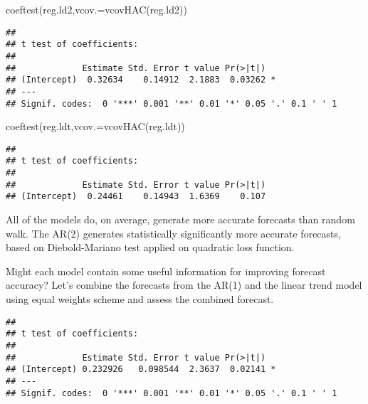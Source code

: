 \documentclass[
  oneside]{book}
\newenvironment{Shaded}{\begin{snugshade}}{\end{snugshade}}
\newcommand{\AttributeTok}[1]{\textcolor[rgb]{0.77,0.63,0.00}{#1}}
\newcommand{\DecValTok}[1]{\textcolor[rgb]{0.00,0.00,0.81}{#1}}
\newcommand{\FunctionTok}[1]{\textcolor[rgb]{0.00,0.00,0.00}{#1}}
\newcommand{\NormalTok}[1]{#1}
\newcommand{\OtherTok}[1]{\textcolor[rgb]{0.56,0.35,0.01}{#1}}
\newcommand{\SpecialCharTok}[1]{\textcolor[rgb]{0.00,0.00,0.00}{#1}}
\begin{document}
\begin{Shaded}
\begin{Highlighting}[]
\FunctionTok{coeftest}\NormalTok{(reg.ld2,}\AttributeTok{vcov.=}\FunctionTok{vcovHAC}\NormalTok{(reg.ld2))}
\end{Highlighting}
\end{Shaded}

\begin{verbatim}
## 
## t test of coefficients:
## 
##             Estimate Std. Error t value Pr(>|t|)  
## (Intercept)  0.32634    0.14912  2.1883  0.03262 *
## ---
## Signif. codes:  0 '***' 0.001 '**' 0.01 '*' 0.05 '.' 0.1 ' ' 1
\end{verbatim}

\begin{Shaded}
\begin{Highlighting}[]
\FunctionTok{coeftest}\NormalTok{(reg.ldt,}\AttributeTok{vcov.=}\FunctionTok{vcovHAC}\NormalTok{(reg.ldt))}
\end{Highlighting}
\end{Shaded}

\begin{verbatim}
## 
## t test of coefficients:
## 
##             Estimate Std. Error t value Pr(>|t|)
## (Intercept)  0.24461    0.14943  1.6369    0.107
\end{verbatim}

All of the models do, on average, generate more accurate forecasts than random walk. The AR(2) generates statistically significantly more accurate forecasts, based on Diebold-Mariano test applied on quadratic loss function.

Might each model contain some useful information for improving forecast accuracy? Let's combine the forecasts from the AR(1) and the linear trend model using equal weights scheme and assess the combined forecast.

\begin{Shaded}
\end{Shaded}

\begin{verbatim}
## 
## t test of coefficients:
## 
##             Estimate Std. Error t value Pr(>|t|)  
## (Intercept) 0.232926   0.098544  2.3637  0.02141 *
## ---
## Signif. codes:  0 '***' 0.001 '**' 0.01 '*' 0.05 '.' 0.1 ' ' 1
\end{verbatim}
\end{document}
